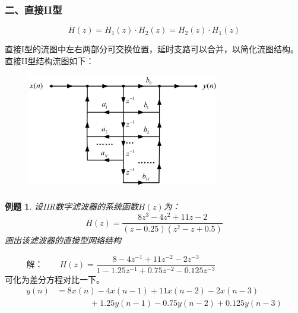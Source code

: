 \documentclass[notheorems,compress,mathserif,table]{beamer}
\newtheorem{example}{例题}
\begin{document}
\begin{frame}[shrink]\frametitle{二、直接II型}%
$$H(z)=H_1(z)\cdot H_2(z)=H_2(z)\cdot H_1(z)$$
\par 直接I型的流图中左右两部分可交换位置，延时支路可以合并，以简化流图结构。
     直接II型结构流图如下：
\begin{figure}[h]
\centering
\includegraphics[width=0.75\textwidth]{zhijieerxing.jpg}
\label{chp5:jibenliutu}
\end{figure}
\end{frame}
\begin{frame}[shrink]\frametitle{}%
\begin{example}\label{exp:zhijieerxing}
设IIR数字滤波器的系统函数$H(z)$为：
$$H(z)=\frac{8z^3-4z^2+11z-2}{(z-0.25)(z^2-z+0.5)}$$
画出该滤波器的直接型网络结构
\end{example}
$$\mbox{解：}\quad\quad H(z)=\frac{8-4z^{-1}+11z^{-2}-2z^{-3}}{1-1.25z^{-1}+0.75z^{-2}-0.125z^{-3}}
\quad\quad\quad\quad\quad\quad\quad\quad$$
可化为差分方程对比一下。
\begin{equation*}
\begin{split}
y(n) &= 8x(n)-4x(n-1)+11x(n-2)-2x(n-3)\\
     &\quad\quad\quad\quad +1.25y(n-1)-0.75y(n-2)+0.125y(n-3)
\end{split}
\end{equation*}
\end{frame}
\end{document}
